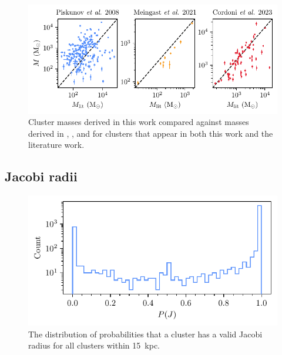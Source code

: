 \begin{figure}[t]
    \centering
    \includegraphics[width=\textwidth]{fig/c4/results_mass_comparison.pdf}
    \caption[Cluster masses derived in this work compared against masses derived in literature works.]{Cluster masses derived in this work compared against masses derived in \cite{piskunov_tidal_2008}, \cite{meingast_extended_2021}, and \cite{cordoni_photometric_binaries_2023} for clusters that appear in both this work and the literature work.}
    \label{fig:dynamics:results:mass_comparison}
\end{figure}


\subsection{Jacobi radii}
\label{sec:dynamics:results:radii}

\begin{figure}[t]
    \centering
    \includegraphics[width=\textwidth]{fig/c4/results_p_jac_distribution.pdf}
    \caption[The distribution of probabilities that a cluster has a valid Jacobi radius]{The distribution of probabilities that a cluster has a valid Jacobi radius for all clusters within 15~kpc.}
    \label{fig:dynamics:results:jacobi_radii_distribution}
\end{figure}


